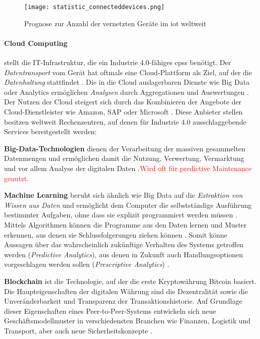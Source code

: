 \begin{figure}[ht]
  \centering
  \texttt{[image: statistic\_connecteddevices.png]}
  \caption[Prognose zur Anzahl der vernetzten Geräte im Internet of TThings weltweit]{Prognose zur Anzahl der vernetzten Geräte im \ac{iot} weltweit \citep{Gartner2017a}}\label{fig:connecteddevices}
\end{figure}

\paragraph{Cloud Computing} stellt die IT-Infrastruktur, die ein Industrie 4.0-fähiges \ac{cpss} benötigt. Der \textit{Datentransport} vom Gerät hat oftmals eine Cloud-Plattform als Ziel, auf der die \textit{Datenhaltung} stattfindet \citep{Elsner2018}. Die in die Cloud auslagerbaren Dienste wie Big Data oder Analytics ermöglichen \textit{Analysen} durch Aggregationen und Auswertungen \citep{Roth2016}. Der Nutzen der Cloud steigert sich durch das Kombinieren der Angebote der Cloud-Dienstleister wie Amazon, SAP oder Microsoft \citep{Hnisch2017}. Diese Anbieter stellen besitzen weltweit Rechenzentren, auf denen für Industrie 4.0 ausschlaggebende Services bereitgestellt werden:

\noindent\hspace*{10mm}
 \textbf{Big-Data-Technologien} dienen der Verarbeitung der massiven gesammelten Datenmengen und ermöglichen damit die Nutzung, Verwertung, Vermarktung und vor allem Analyse der digitalen Daten \citep{Radtke2019}.\textcolor{red}{{Wird oft für predictive Maintenance genutzt.}}

 \noindent\hspace*{10mm}
 \textbf{Machine Learning} beruht sich ähnlich wie Big Data auf die \textit{Extraktion von Wissen aus Daten} und ermöglicht dem Computer die selbstständige Ausführung bestimmter Aufgaben, ohne dass sie explizit programmiert werden müssen \citep{Hnisch2017}. Mittels Algorithmen können die Programme aus den Daten lernen und Muster erkennen, aus denen sie Schlussfolgerungen ziehen können \citep{Elsner2018}. Somit könne Aussagen über das wahrscheinlich zukünftige Verhalten des Systems getroffen werden (\textit{Predictive Analytics}), aus denen in Zukunft auch Handlungsoptionen vorgeschlagen werden sollen (\textit{Prescriptive Analytics}) \citep{Huebschle2017}.

 \noindent\hspace*{10mm}
 \textbf{Blockchain} ist die Technologie, auf der die erste Kryptowährung Bitcoin basiert. Die Haupteigenschaften der digitalen Währung sind die Dezentralität sowie  die Unveränderbarkeit und Transparenz der Transaktionshistorie. Auf Grundlage dieser Eigenschaften eines Peer-to-Peer-Systems entwickeln sich neue Geschäftsmodellmuster in verschiedensten Branchen wie Finanzen,  Logistik und Transport, aber auch neue Sicherheitskonzepte \citep{Elsner2018}.

